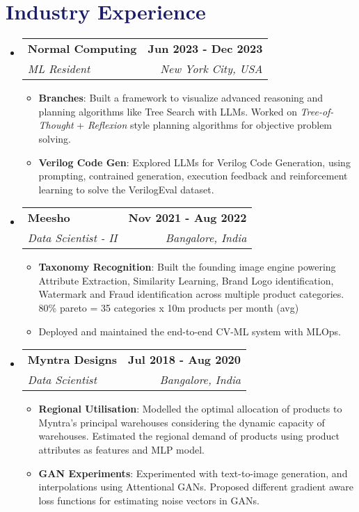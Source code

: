 \documentclass[letterpaper,10.7pt]{article}
\makeatletter
\newcommand{\resumeItem}[1]{
  \item\small{
    {#1 \vspace{-2pt}}
  }
}
\newcommand{\resumeSubheading}[4]{
  \vspace{-2pt}\item
    \begin{tabular*}{1.0\textwidth}[t]{l@{\extracolsep{\fill}}r}
      \textbf{#1} & \textbf{\small #2} \\
      \textit{\small#3} & \textit{\small #4} \\
    \end{tabular*}\vspace{-7pt}
}
\newcommand{\resumeSubHeadingListStart}{\begin{itemize}[leftmargin=0.0in, label={}]}
\newcommand{\resumeSubHeadingListEnd}{\end{itemize}}
\newcommand{\resumeItemListStart}{\begin{itemize}}
\newcommand{\resumeItemListEnd}{\end{itemize}\vspace{-5pt}}
\makeatother
\begin{document}
\vspace{-0.2in}
\section{\textcolor{MidnightBlue}{Industry Experience}}
\resumeSubHeadingListStart

\resumeSubheading
{Normal Computing}{Jun 2023 - Dec 2023}
{ML Resident}{New York City, USA}
\resumeItemListStart
\resumeItem{\textbf{Branches}: Built a framework to visualize advanced reasoning and planning algorithms like Tree Search with LLMs. Worked on {\it Tree-of-Thought} + {\it Reflexion} style planning algorithms for objective problem solving.}

\resumeItem{\textbf{Verilog Code Gen}: Explored LLMs for Verilog Code Generation, using prompting, contrained generation, execution feedback and reinforcement learning to solve the VerilogEval dataset.}
\resumeItemListEnd 

\vspace{0.3em}
\resumeSubheading
{Meesho}{Nov 2021 - Aug 2022}
{Data Scientist - II}{Bangalore, India}
\resumeItemListStart
\resumeItem{\textbf{Taxonomy Recognition}: Built the founding image engine powering Attribute Extraction, Similarity Learning, Brand Logo identification, Watermark and Fraud identification across multiple product categories. 80\% pareto = 35 categories x 10m products per month (avg)}
\resumeItem{Deployed and maintained the end-to-end CV-ML system with MLOps. \color{blue}{Project Impact: 30\% Reduction in cost = \$20M per year}} 
\resumeItemListEnd 

\vspace{0.3em}
\resumeSubheading
{Myntra Designs}{Jul 2018 - Aug 2020}{Data Scientist}{Bangalore, India}
\resumeItemListStart
\resumeItem{\textbf{Regional Utilisation}: Modelled the optimal allocation of products to Myntra's principal warehouses considering the dynamic capacity of warehouses. Estimated the regional demand of products using product attributes as features and MLP model. \color{blue}{\href{https://arxiv.org/abs/2007.05081}{\color{blue}{[arxiv]}} \\ \color{blue}{Project Impact: 27\% Improvement in RU; 20\% Improvement in 2DD}}}
\resumeItem{\textbf{GAN Experiments}: Experimented with text-to-image generation, and interpolations using Attentional GANs. Proposed different gradient aware loss functions for estimating noise vectors in GANs.}
\resumeItemListEnd
\resumeSubHeadingListEnd
\end{document}
